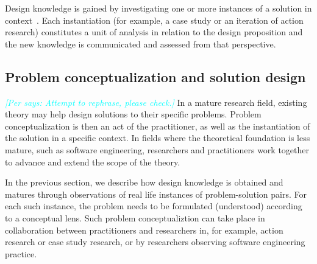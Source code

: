 \documentclass[graybox]{svmult}
\newcommand{\peggy}[1]{\textcolor{blue}{{\it [Peggy says: #1]}}}
\newcommand{\per}[1]{\textcolor{cyan}{{\it [Per says: #1]}}}
\newcommand{\peggy}[1]{}
\newcommand{\per}[1]{}
\begin{document}
Design knowledge is gained by investigating one or more instances of a solution in context~\cite{wieringa_what_2014}. Each instantiation (for example, a case study or an iteration of action research) constitutes a unit of analysis in relation to the design proposition and the new knowledge is communicated and assessed from that perspective. 

\subsection{Problem conceptualization and solution design}


\per{Attempt to rephrase, please check.}
In a mature research field, existing theory may help design solutions to their specific problems. Problem conceptualization is then an act of the practitioner, as well as the instantiation of the solution in a specific context. In fields where the theoretical foundation is less mature, such as software engineering, researchers and practitioners work together to advance and extend the scope of the theory. 

 In the previous section, we describe how design knowledge is obtained and matures through observations of real life instances of problem-solution pairs. For each such instance, the problem needs to be formulated (understood) according to a conceptual lens. Such problem conceptualiztion can take place in collaboration between practitioners and researchers in, for example, action research or case study research, or by researchers observing software engineering practice.

\end{document}
